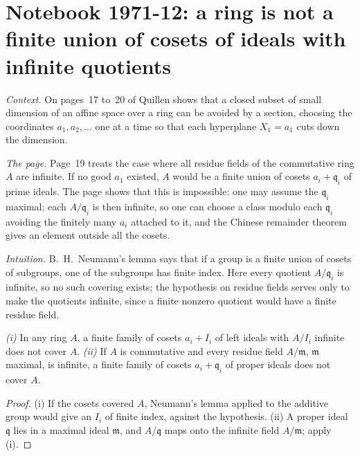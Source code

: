 \section[Notebook 1971-12: a ring is not a finite union of cosets]{Notebook 1971-12: a ring is not a finite union of cosets of ideals with infinite quotients\protect{}}\label{sec:quillen-1971-12-cover}

\emph{Context.} On pages~17 to~20 of  Quillen shows that a closed subset of small dimension of an affine space over a ring can be avoided by a section, choosing the coordinates $a_1, a_2, \ldots$ one at a time so that each hyperplane $X_1 = a_1$ cuts down the dimension.

\emph{The page.} Page~19 treats the case where all residue fields of the commutative ring $A$ are infinite. If no good $a_1$ existed, $A$ would be a finite union of cosets $a_i + \mathfrak q_i$ of prime ideals. The page shows that this is impossible: one may assume the $\mathfrak q_i$ maximal; each $A/\mathfrak q_i$ is then infinite, so one can choose a class modulo each $\mathfrak q_i$ avoiding the finitely many $a_i$ attached to it, and the Chinese remainder theorem gives an element outside all the cosets.

\emph{Intuition.} B.~H.~Neumann's lemma says that if a group is a finite union of cosets of subgroups, one of the subgroups has finite index. Here every quotient $A/\mathfrak q_i$ is infinite, so no such covering exists; the hypothesis on residue fields serves only to make the quotients infinite, since a finite nonzero quotient would have a finite residue field.

\begin{encadre}
\begin{theoreme}\label{thm:quillen-1971-12-cover}
\emph{(i)} In any ring $A$, a finite family of cosets $a_i + I_i$ of left ideals with $A/I_i$ infinite does not cover $A$. \emph{(ii)} If $A$ is commutative and every residue field $A/\mathfrak m$, $\mathfrak m$ maximal, is infinite, a finite family of cosets $a_i + \mathfrak q_i$ of proper ideals does not cover $A$.
\end{theoreme}
\end{encadre}

\begin{proof}
(i) If the cosets covered $A$, Neumann's lemma applied to the additive group would give an $I_i$ of finite index, against the hypothesis. (ii) A proper ideal $\mathfrak q$ lies in a maximal ideal $\mathfrak m$, and $A/\mathfrak q$ maps onto the infinite field $A/\mathfrak m$; apply (i).
\end{proof}

